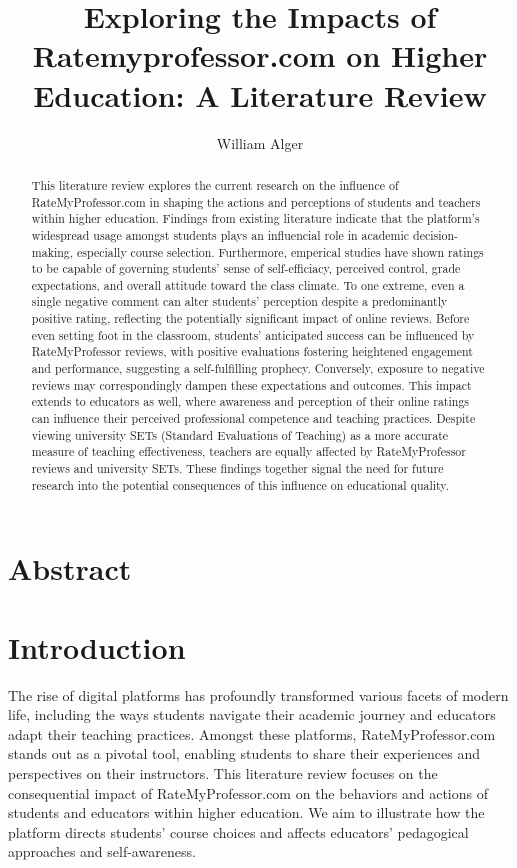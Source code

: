 \documentclass[man, 12pt]{apa7}
\title{Exploring the Impacts of Ratemyprofessor.com on Higher Education: A Literature Review}
\author{William Alger}
\affiliation{Northern Kentucky University}
\begin{document}
\maketitle

\section{Abstract}
\begin{abstract}

This literature review explores the current research on the influence of RateMyProfessor.com in shaping the actions and perceptions of students and teachers within higher education. Findings from existing literature indicate that the platform's widespread usage amongst students plays an influencial role in academic decision-making, especially course selection. Furthermore, emperical studies have shown ratings to be capable of governing students' sense of self-efficiacy, perceived control, grade expectations, and overall attitude toward the class climate. To one extreme, even a single negative comment can alter students' perception despite a predominantly positive rating, reflecting the potentially significant impact of online reviews. Before even setting foot in the classroom, students' anticipated success can be influenced by RateMyProfessor reviews, with positive evaluations fostering heightened engagement and performance, suggesting a self-fulfilling prophecy. Conversely, exposure to negative reviews may correspondingly dampen these expectations and outcomes. This impact extends to educators as well, where awareness and perception of their online ratings can influence their perceived professional competence and teaching practices. Despite viewing university SETs (Standard Evaluations of Teaching) as a more accurate measure of teaching effectiveness, teachers are equally affected by RateMyProfessor reviews and university SETs. These findings together signal the need for future research into the potential consequences of this influence on educational quality.

\end{abstract}

\section{Introduction}
The rise of digital platforms has profoundly transformed various facets of modern life, including the ways students navigate their academic journey and educators adapt their teaching practices. Amongst these platforms, RateMyProfessor.com stands out as a pivotal tool, enabling students to share their experiences and perspectives on their instructors. This literature review focuses on the consequential impact of RateMyProfessor.com on the behaviors and actions of students and educators within higher education. We aim to illustrate how the platform directs students' course choices and affects educators' pedagogical approaches and self-awareness. 
\end{document}
